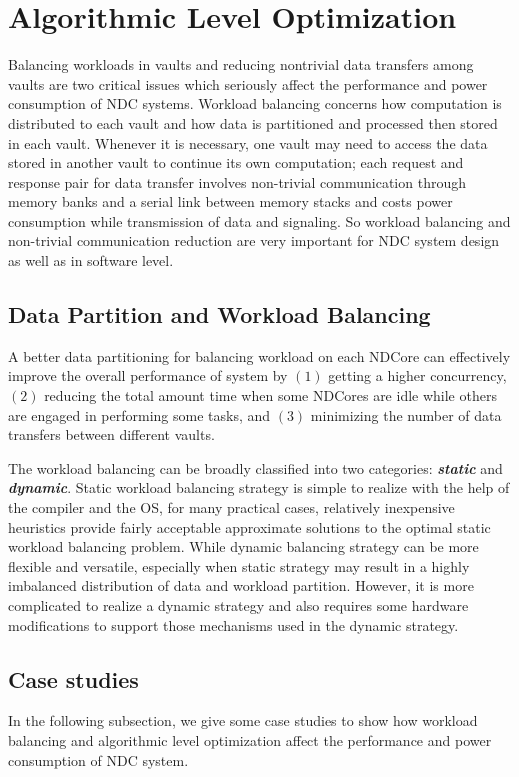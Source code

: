 \documentclass[letterpaper, 11pt, conference, margin=1in]{ieeeconf}   %
\begin{document}
\section{Algorithmic Level Optimization}
Balancing workloads in vaults and reducing nontrivial data transfers among vaults are two critical issues which seriously affect the performance and power consumption of NDC systems. Workload balancing concerns how computation is distributed to each vault and how data is partitioned and processed then stored in each vault. Whenever it is necessary, one vault may need to access the data stored in another vault to continue its own computation; each request and response pair for data transfer involves non-trivial communication through memory banks and a serial link between memory stacks and costs power consumption while transmission of data and signaling. So workload balancing and non-trivial communication reduction are very important for NDC system design as well as in software level.
\subsection{Data Partition and Workload Balancing}
A better data partitioning for balancing workload on each NDCore can effectively improve the overall performance of system by $\left(1\right)$ getting a higher concurrency, $\left(2\right)$ reducing the total amount time when some NDCores are idle while others are engaged in performing some tasks, and $\left(3\right)$ minimizing the number of data transfers between different vaults.

The workload balancing can be broadly classified into two categories: \textbf{\textit{static}} and \textbf{\textit{dynamic}}. Static workload balancing strategy is simple to realize with the help of the compiler and the OS, for many practical cases, relatively inexpensive heuristics provide fairly acceptable approximate solutions to the optimal static workload balancing problem. While dynamic balancing strategy can be more flexible and versatile, especially when static strategy may result in a highly imbalanced distribution of data and workload partition. However, it is more complicated to realize a dynamic strategy and also requires some hardware modifications to support those mechanisms used in the dynamic strategy.

\subsection{\bf Case studies}
In the following subsection, we give some case studies to show how workload balancing and algorithmic level optimization affect the performance and power consumption of NDC system.
\end{document}
